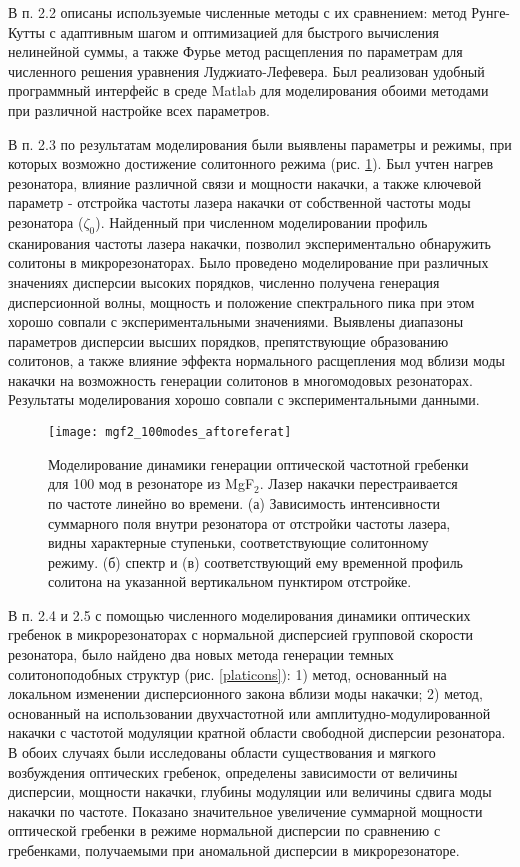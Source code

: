 В п. 2.2 описаны используемые численные методы с их сравнением: метод Рунге-Кутты с адаптивным шагом и оптимизацией для быстрого вычисления нелинейной суммы, а также Фурье метод расщепления по параметрам для численного решения уравнения Луджиато-Лефевера. Был реализован удобный программный интерфейс в среде Matlab для моделирования обоими методами при различной настройке всех параметров.

В п. 2.3 по результатам моделирования были выявлены параметры и режимы, при которых возможно достижение солитонного режима (рис. \ref{100modes}). Был учтен нагрев резонатора, влияние различной связи и мощности накачки, а также ключевой параметр - отстройка частоты лазера накачки от собственной частоты моды резонатора ($\zeta_0$). Найденный при численном моделировании профиль сканирования частоты лазера накачки, позволил экспериментально обнаружить солитоны в микрорезонаторах. Было проведено моделирование при различных значениях дисперсии высоких порядков, численно получена генерация дисперсионной волны, мощность и положение спектрального пика при этом хорошо совпали с экспериментальными значениями. Выявлены диапазоны параметров дисперсии высших порядков, препятствующие образованию солитонов, а также влияние эффекта нормального расщепления мод вблизи моды накачки на возможность генерации солитонов в многомодовых резонаторах. Результаты моделирования хорошо совпали с экспериментальными данными.

\begin{figure}[!htb]
  \centering
  \texttt{[image: mgf2\_100modes\_aftoreferat]}
  \setlength{\belowcaptionskip}{1pt}
  \caption{Моделирование динамики генерации оптической частотной гребенки для 100 мод в резонаторе из MgF$_2$. Лазер накачки перестраивается по частоте линейно во времени. (а) Зависимость интенсивности суммарного поля внутри резонатора от отстройки частоты лазера, видны характерные ступеньки, соответствующие солитонному режиму. (б) спектр и (в) соответствующий ему временной профиль солитона на указанной вертикальном пунктиром отстройке.}
  \label{100modes}
\end{figure}

В п. 2.4 и 2.5 с помощью численного моделирования динамики оптических гребенок в микрорезонаторах с нормальной дисперсией групповой скорости резонатора, было найдено два новых метода генерации темных солитоноподобных структур (рис. \ref{platicons}): 1) метод, основанный на локальном изменении дисперсионного закона вблизи моды накачки; 2) метод, основанный на использовании двухчастотной или амплитудно-модулированной накачки с частотой модуляции кратной области свободной дисперсии резонатора. В обоих случаях были исследованы области существования и мягкого возбуждения оптических гребенок, определены зависимости от величины дисперсии, мощности накачки, глубины модуляции или величины сдвига моды накачки по частоте. Показано значительное увеличение суммарной мощности оптической гребенки в режиме нормальной дисперсии по сравнению с гребенками, получаемыми при аномальной дисперсии в микрорезонаторе.

